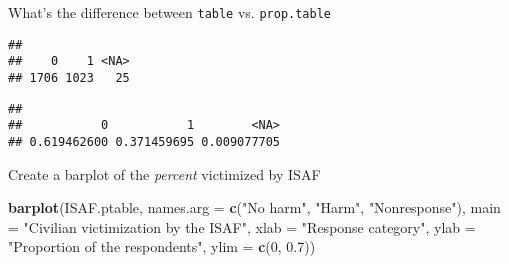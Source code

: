 \documentclass[ignorenonframetext,]{beamer}
\newenvironment{Shaded}{\begin{snugshade}}{\end{snugshade}}
\newcommand{\KeywordTok}[1]{\textcolor[rgb]{0.13,0.29,0.53}{\textbf{#1}}}
\newcommand{\DataTypeTok}[1]{\textcolor[rgb]{0.13,0.29,0.53}{#1}}
\newcommand{\DecValTok}[1]{\textcolor[rgb]{0.00,0.00,0.81}{#1}}
\newcommand{\FloatTok}[1]{\textcolor[rgb]{0.00,0.00,0.81}{#1}}
\newcommand{\StringTok}[1]{\textcolor[rgb]{0.31,0.60,0.02}{#1}}
\newcommand{\OtherTok}[1]{\textcolor[rgb]{0.56,0.35,0.01}{#1}}
\newcommand{\OperatorTok}[1]{\textcolor[rgb]{0.81,0.36,0.00}{\textbf{#1}}}
\newcommand{\NormalTok}[1]{#1}
\begin{document}
\begin{frame}[fragile]{What's the difference between \texttt{table} vs.
\texttt{prop.table}}

\begin{Shaded}
\end{Shaded}

\begin{verbatim}
## 
##    0    1 <NA> 
## 1706 1023   25
\end{verbatim}

\begin{Shaded}
\end{Shaded}

\begin{verbatim}
## 
##           0           1        <NA> 
## 0.619462600 0.371459695 0.009077705
\end{verbatim}

\end{frame}

\begin{frame}[fragile]{Create a barplot of the \textit{percent}
victimized by ISAF}

\begin{Shaded}
\begin{Highlighting}[]
\KeywordTok{barplot}\NormalTok{(ISAF.ptable,}
        \DataTypeTok{names.arg =} \KeywordTok{c}\NormalTok{(}\StringTok{"No harm"}\NormalTok{, }\StringTok{"Harm"}\NormalTok{, }\StringTok{"Nonresponse"}\NormalTok{), }
        \DataTypeTok{main =} \StringTok{"Civilian victimization by the ISAF"}\NormalTok{,}
        \DataTypeTok{xlab =} \StringTok{"Response category"}\NormalTok{,}
        \DataTypeTok{ylab =} \StringTok{"Proportion of the respondents"}\NormalTok{, }
        \DataTypeTok{ylim =} \KeywordTok{c}\NormalTok{(}\DecValTok{0}\NormalTok{, }\FloatTok{0.7}\NormalTok{))}
\end{Highlighting}
\end{Shaded}

\end{frame}
\end{document}
